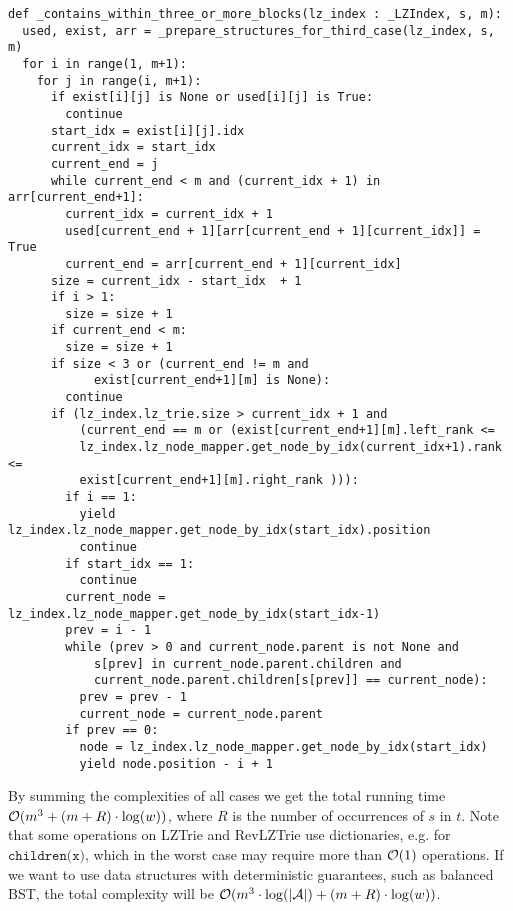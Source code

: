 \begin{verbatim}
def _contains_within_three_or_more_blocks(lz_index : _LZIndex, s, m):
  used, exist, arr = _prepare_structures_for_third_case(lz_index, s, m)
  for i in range(1, m+1):
    for j in range(i, m+1):
      if exist[i][j] is None or used[i][j] is True:
        continue
      start_idx = exist[i][j].idx
      current_idx = start_idx
      current_end = j
      while current_end < m and (current_idx + 1) in arr[current_end+1]:
        current_idx = current_idx + 1
        used[current_end + 1][arr[current_end + 1][current_idx]] = True
        current_end = arr[current_end + 1][current_idx]
      size = current_idx - start_idx  + 1
      if i > 1:
        size = size + 1
      if current_end < m:
        size = size + 1
      if size < 3 or (current_end != m and
            exist[current_end+1][m] is None):
        continue
      if (lz_index.lz_trie.size > current_idx + 1 and
          (current_end == m or (exist[current_end+1][m].left_rank <=
          lz_index.lz_node_mapper.get_node_by_idx(current_idx+1).rank <=
          exist[current_end+1][m].right_rank ))):
        if i == 1:
          yield lz_index.lz_node_mapper.get_node_by_idx(start_idx).position
          continue
        if start_idx == 1:
          continue
        current_node = lz_index.lz_node_mapper.get_node_by_idx(start_idx-1)
        prev = i - 1
        while (prev > 0 and current_node.parent is not None and
            s[prev] in current_node.parent.children and
            current_node.parent.children[s[prev]] == current_node):
          prev = prev - 1
          current_node = current_node.parent
        if prev == 0:
          node = lz_index.lz_node_mapper.get_node_by_idx(start_idx)
          yield node.position - i + 1
\end{verbatim}

By summing the complexities of all cases we get the total running time $\mathcal{O}(m^3 + (m + R) \cdot \log (w))$, where $R$ is the number of occurrences of $s$ in $t$. Note that some operations on LZTrie and RevLZTrie use dictionaries, e.g. for $\texttt{children(x)}$, which in the worst case may require more than $\mathcal{O}(1)$ operations. If we want to use data structures with deterministic guarantees, such as balanced BST, the total complexity will be $\mathcal{O}(m^3 \cdot \log (|\mathcal{A}|) + (m + R)\cdot \log (w))$. 